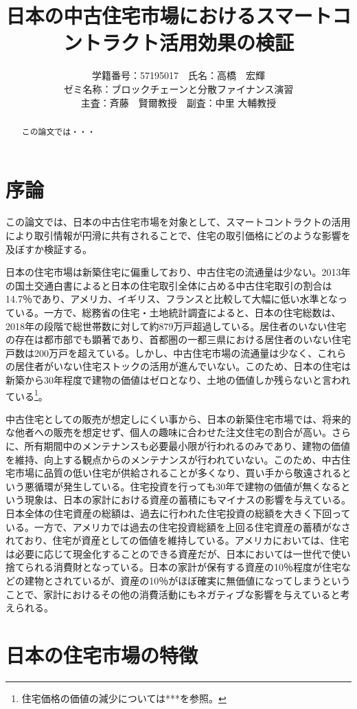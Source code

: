\documentclass[a4paper,10.5pt]{jlreq}
\title{日本の中古住宅市場におけるスマートコントラクト活用効果の検証}
\author{
学籍番号：57195017　氏名：高橋　宏輝
\\ゼミ名称：ブロックチェーンと分散ファイナンス演習
\\主査：斉藤　賢爾教授　副査：中里 大輔教授}
\begin{document}
\date{}
\maketitle
\begin{abstract}
この論文では・・・
\end{abstract}

\tableofcontents

\section{序論}
この論文では、日本の中古住宅市場を対象として、スマートコントラクトの活用により取引情報が円滑に共有されることで、住宅の取引価格にどのような影響を及ぼすか検証する。

日本の住宅市場は新築住宅に偏重しており、中古住宅の流通量は少ない。2013年の国土交通白書によると日本の住宅取引全体に占める中古住宅取引の割合は14.7％であり、アメリカ、イギリス、フランスと比較して大幅に低い水準となっている。一方で、総務省の住宅・土地統計調査によると、日本の住宅総数は、2018年の段階で総世帯数に対して約879万戸超過している。居住者のいない住宅の存在は都市部でも顕著であり、首都圏の一都三県における居住者のいない住宅戸数は200万戸を超えている。しかし、中古住宅市場の流通量は少なく、これらの居住者がいない住宅ストックの活用が進んでいない。このため、日本の住宅は新築から30年程度で建物の価値はゼロとなり、土地の価値しか残らないと言われている\footnote{住宅価格の価値の減少については***を参照。}。

中古住宅としての販売が想定しにくい事から、日本の新築住宅市場では、将来的な他者への販売を想定せず、個人の趣味に合わせた注文住宅の割合が高い。さらに、所有期間中のメンテナンスも必要最小限が行われるのみであり、建物の価値を維持、向上する観点からのメンテナンスが行われていない。このため、中古住宅市場に品質の低い住宅が供給されることが多くなり、買い手から敬遠されるという悪循環が発生している。住宅投資を行っても30年で建物の価値が無くなるという現象は、日本の家計における資産の蓄積にもマイナスの影響を与えている。
日本全体の住宅資産の総額は、過去に行われた住宅投資の総額を大きく下回っている。一方で、アメリカでは過去の住宅投資総額を上回る住宅資産の蓄積がなされており、住宅が資産としての価値を維持している。アメリカにおいては、住宅は必要に応じて現金化することのできる資産だが、日本においては一世代で使い捨てられる消費財となっている。日本の家計が保有する資産の10％程度が住宅などの建物とされているが、資産の10％がほぼ確実に無価値になってしまうということで、家計におけるその他の消費活動にもネガティブな影響を与えていると考えられる。

\section{日本の住宅市場の特徴}
\end{document}
